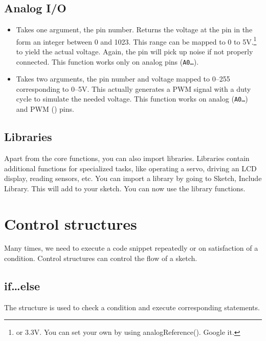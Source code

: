 \documentclass{article}
\begin{document}
	\subsection{Analog I/O}

		\begin{itemize}

			\item {} Takes one argument, the pin number. Returns the voltage at the pin in the form an integer between 0 and 1023. This range can be mapped to 0 to 5V.\footnote{or 3.3V. You can set your own by using analogReference(). Google it.} to yield the actual voltage. Again, the pin will pick up noise if not properly connected. This function works only on analog pins (\texttt{A0\ldots}).

			\item {} Takes two arguments, the pin number and voltage mapped to 0--255 corresponding to 0--5V. This actually generates a PWM signal with a duty cycle to simulate the needed voltage. This function works on analog (\texttt{A0\ldots}) and PWM (\texttt{\raisebox{0.5ex}{\texttildelow}}) pins.

		\end{itemize}

	\subsection{Libraries}

		Apart from the core functions, you can also import libraries. Libraries contain additional functions for specialized tasks, like operating a servo, driving an LCD display, reading sensors, etc. You can import a library by going to Sketch, Include Library. This will add  to your sketch. You can now use the library functions.

\section{Control structures}

	Many times, we need to execute a code snippet repeatedly or on satisfaction of a condition. Control structures can control the flow of a sketch. 

	\subsection{if\ldots else}

		The  structure is used to check a condition and execute corresponding statements.
\end{document}
